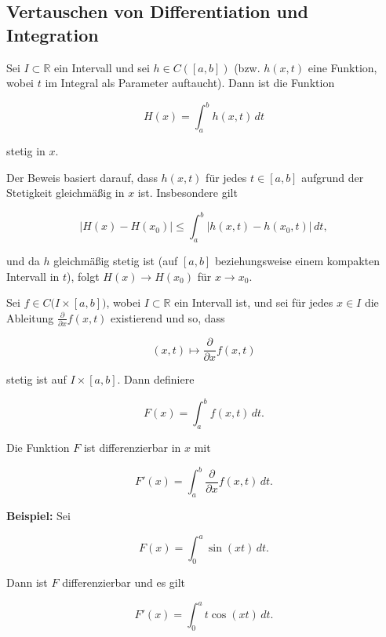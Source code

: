 \subsection{Vertauschen von Differentiation und Integration}


\begin{lemma}
Sei \(I\subset \mathbb{R}\) ein Intervall und sei \(h\in C([a,b])\) (bzw. \(h(x,t)\) eine Funktion, wobei \(t\) im Integral als Parameter auftaucht). Dann ist die Funktion


\[
H(x)=\int_a^b h(x,t)\,dt
\]


stetig in \(x\). 
\end{lemma}

\begin{beweisbox}
Der Beweis basiert darauf, dass \(h(x,t)\) für jedes \(t\in [a,b]\) aufgrund der Stetigkeit gleichmäßig in \(x\) ist. Insbesondere gilt


\[
|H(x)-H(x_0)|\le \int_a^b |h(x,t)-h(x_0,t)|\,dt,
\]


und da \(h\) gleichmäßig stetig ist (auf \( [a,b]\) beziehungsweise einem kompakten Intervall in \(t\)), folgt \(H(x)\to H(x_0)\) für \(x\to x_0\). 
\end{beweisbox}

\begin{satz}{}
Sei \(f\in C\bigl(I\times [a,b]\bigr)\), wobei \(I\subset\mathbb{R}\) ein Intervall ist, und sei für jedes \(x\in I\) die Ableitung \(\frac{\partial}{\partial x}f(x,t)\) existierend und so, dass


\[
(x,t)\mapsto \frac{\partial}{\partial x}f(x,t)
\]


stetig ist auf \(I\times [a,b]\). Dann definiere


\[
F(x)=\int_a^b f(x,t)\,dt.
\]


Die Funktion \(F\) ist differenzierbar in \(x\) mit


\[
F'(x)=\int_a^b \frac{\partial}{\partial x}f(x,t)\,dt.
\]


\end{satz}


\begin{beispielbox}
\textbf{Beispiel:} Sei


\[
F(x)=\int_0^a \sin(xt)\,dt.
\]


Dann ist \(F\) differenzierbar und es gilt


\[
F'(x)=\int_0^a t\cos(xt)\,dt.
\]


\end{beispielbox}

